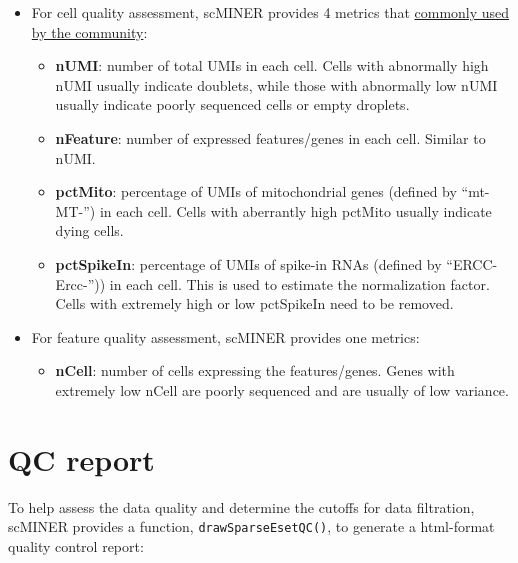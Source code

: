 \documentclass[
  12pt,
]{book}
\providecommand{\tightlist}{%
  \setlength{\itemsep}{0pt}\setlength{\parskip}{0pt}}
\begin{document}
\begin{itemize}
\item
  For cell quality assessment, scMINER provides 4 metrics that \href{https://www.ncbi.nlm.nih.gov/pmc/articles/PMC4758103/pdf/13059_2016_Article_888.pdf}{commonly used by the community}:

  \begin{itemize}
  \tightlist
  \item
    \textbf{nUMI}: number of total UMIs in each cell. Cells with abnormally high nUMI usually indicate doublets, while those with abnormally low nUMI usually indicate poorly sequenced cells or empty droplets.
  \item
    \textbf{nFeature}: number of expressed features/genes in each cell. Similar to nUMI.
  \item
    \textbf{pctMito}: percentage of UMIs of mitochondrial genes (defined by ``mt-\textbar MT-'') in each cell. Cells with aberrantly high pctMito usually indicate dying cells.
  \item
    \textbf{pctSpikeIn}: percentage of UMIs of spike-in RNAs (defined by ``ERCC-\textbar Ercc-'')) in each cell. This is used to estimate the normalization factor. Cells with extremely high or low pctSpikeIn need to be removed.
  \end{itemize}
\item
  For feature quality assessment, scMINER provides one metrics:

  \begin{itemize}
  \tightlist
  \item
    \textbf{nCell}: number of cells expressing the features/genes. Genes with extremely low nCell are poorly sequenced and are usually of low variance.
  \end{itemize}
\end{itemize}

\section{QC report}\label{qc-report}

To help assess the data quality and determine the cutoffs for data filtration, scMINER provides a function, \texttt{drawSparseEsetQC()}, to generate a html-format quality control report:
\end{document}
